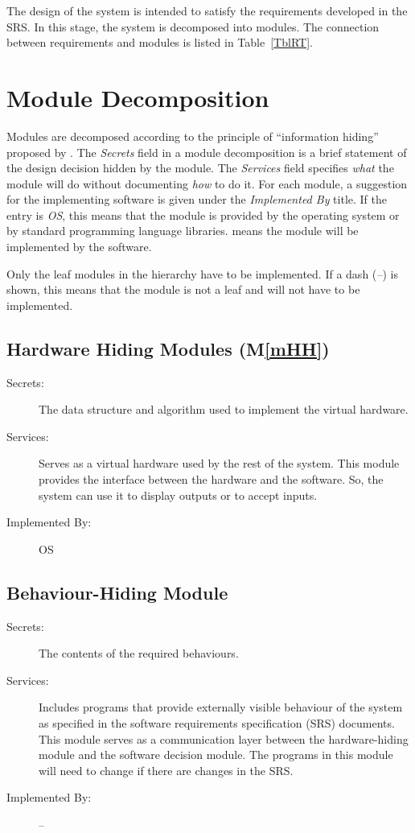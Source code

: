 \documentclass[12pt, titlepage]{article}
\newcommand{\mref}[1]{M\ref{#1}}
\begin{document}
The design of the system is intended to satisfy the requirements developed in
the SRS. In this stage, the system is decomposed into modules. The connection
between requirements and modules is listed in Table~\ref{TblRT}.

\section{Module Decomposition} \label{SecMD}

Modules are decomposed according to the principle of ``information hiding''
proposed by \citet{ParnasEtAl1984}. The \emph{Secrets} field in a module
decomposition is a brief statement of the design decision hidden by the
module. The \emph{Services} field specifies \emph{what} the module will do
without documenting \emph{how} to do it. For each module, a suggestion for the
implementing software is given under the \emph{Implemented By} title. If the
entry is \emph{OS}, this means that the module is provided by the operating
system or by standard programming language libraries.  \emph{\progname{}} means the
module will be implemented by the \progname{} software.

Only the leaf modules in the hierarchy have to be implemented. If a dash
(\emph{--}) is shown, this means that the module is not a leaf and will not have
to be implemented.

\subsection{Hardware Hiding Modules (\mref{mHH})}

\begin{description}
\item[Secrets:]The data structure and algorithm used to implement the virtual
  hardware.
\item[Services:]Serves as a virtual hardware used by the rest of the
  system. This module provides the interface between the hardware and the
  software. So, the system can use it to display outputs or to accept inputs.
\item[Implemented By:] OS
\end{description}

\subsection{Behaviour-Hiding Module}

\begin{description}
\item[Secrets:]The contents of the required behaviours.
\item[Services:]Includes programs that provide externally visible behaviour of
  the system as specified in the software requirements specification (SRS)
  documents. This module serves as a communication layer between the
  hardware-hiding module and the software decision module. The programs in this
  module will need to change if there are changes in the SRS.
\item[Implemented By:] --
\end{description}
\end{document}
